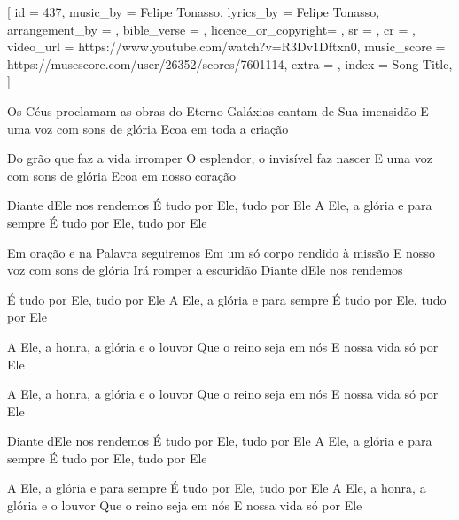 [
    id                  = {437},
    music_by            = {Felipe Tonasso}, %
    lyrics_by           = {Felipe Tonasso}, %
    arrangement_by      = {}, %
    bible_verse         = {},
    licence_or_copyright= {},
    sr                  = {},
    cr                  = {},
    video_url           = {https://www.youtube.com/watch?v=R3Dv1Dftxn0}, %
    music_score         = {https://musescore.com/user/26352/scores/7601114},
    extra               = {},
    index               = {Song Title},
]

\beginverse
Os Céus proclamam as obras do Eterno
Galáxias cantam de Sua imensidão
E uma voz com sons de glória
Ecoa em toda a criação
\endverse

\beginverse
Do grão que faz a vida irromper
O esplendor, o invisível faz nascer
E uma voz com sons de glória
Ecoa em nosso coração
\endverse

\beginverse
Diante dEle nos rendemos
É tudo por Ele, tudo por Ele
A Ele, a glória e para sempre
É tudo por Ele, tudo por Ele
\endverse

\beginverse
Em oração e na Palavra seguiremos
Em um só corpo rendido à missão
E nosso voz com sons de glória
Irá romper a escuridão
Diante dEle nos rendemos
\endverse

\beginverse
É tudo por Ele, tudo por Ele
A Ele, a glória e para sempre
É tudo por Ele, tudo por Ele
\endverse

\beginverse
A Ele, a honra, a glória e o louvor
Que o reino seja em nós
E nossa vida só por Ele

A Ele, a honra, a glória e o louvor
Que o reino seja em nós
E nossa vida só por Ele
\endverse

\beginverse
Diante dEle nos rendemos
É tudo por Ele, tudo por Ele
A Ele, a glória e para sempre
É tudo por Ele, tudo por Ele
\endverse

\beginverse
A Ele, a glória e para sempre
É tudo por Ele, tudo por Ele
A Ele, a honra, a glória e o louvor
Que o reino seja em nós
E nossa vida só por Ele
\endverse

\beginchorus

\endchorus

\endsong
